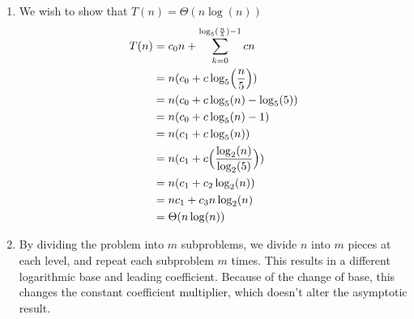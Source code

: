 \documentclass[11pt]{article}
\begin{document}
\begin{enumerate}
\begin{enumerate}
\item We wish to show that $T(n) = \Theta(n \log (n))$
\begin{align*}
T(n) &= c_0n+ \sum_{k = 0}^{\log_5(\frac{n}{5})-1}cn \\&= n(c_0 + c\log_5 \Bigl(\frac{n}{5}\Bigr))
\\&= n(c_0+c\log_5(n) - \log_5(5) )
\\&= n(c_0+c\log_5(n) - 1 )
\\&= n(c_1+c\log_5(n))
\\&= n(c_1+c\Bigl(\frac{\log_2(n)}{\log_2(5)} \Bigr))
\\&= n(c_1+c_2\log_2(n))
\\&= nc_1 + c_3n\log_2(n)
\\&= \Theta ( n \log(n))
\end{align*}
\item By dividing the problem into $m$ subproblems, we divide $n$ into $m$ pieces at each level, and repeat each subproblem $m$ times.  This results in a different logarithmic base and leading coefficient.  Because of the change of base, this changes the constant coefficient multiplier, which doesn't alter the asymptotic result.
\end{enumerate}
\end{enumerate}
\end{document}

